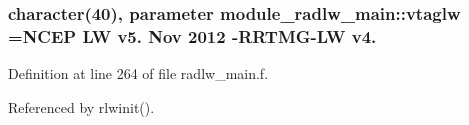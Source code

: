 \subsubsection[{\texorpdfstring{vtaglw}{vtaglw}}]{\setlength{\rightskip}{0pt plus 5cm}character(40), parameter module\+\_\+radlw\+\_\+main\+::vtaglw =\textquotesingle{}N\+C\+EP LW v5. Nov 2012 -\/R\+R\+T\+MG-\/LW v4. \textquotesingle{}\hspace{0.3cm}{\ttfamily [private]}}\hypertarget{namespacemodule__radlw__main_a8d63a28d2550f8e193619e46a4c47d70}{}\label{namespacemodule__radlw__main_a8d63a28d2550f8e193619e46a4c47d70}


Definition at line 264 of file radlw\+\_\+main.\+f.



Referenced by rlwinit().


